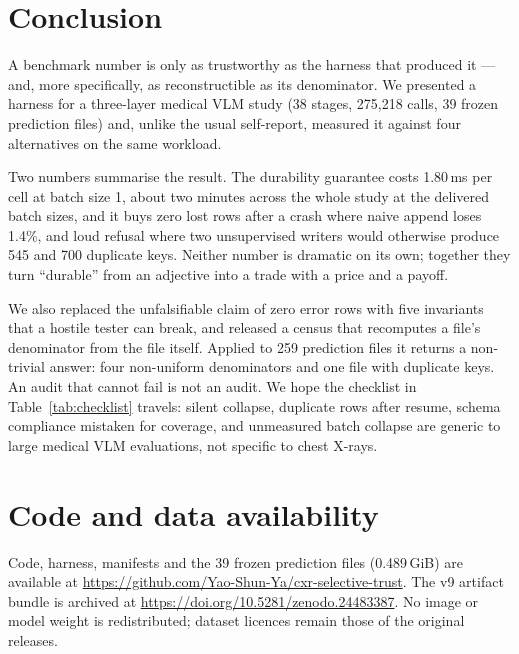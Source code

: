 \section{Conclusion}
\label{sec:conclusion}

A benchmark number is only as trustworthy as the harness that produced it --- and, more specifically, as reconstructible as its denominator. We presented a harness for a three-layer medical VLM study (38 stages, 275,218 calls, 39 frozen prediction files) and, unlike the usual self-report, measured it against four alternatives on the same workload.

Two numbers summarise the result. The durability guarantee costs 1.80\,ms per cell at batch size 1, about two minutes across the whole study at the delivered batch sizes, and it buys zero lost rows after a crash where naive append loses 1.4\%, and loud refusal where two unsupervised writers would otherwise produce 545 and 700 duplicate keys. Neither number is dramatic on its own; together they turn ``durable'' from an adjective into a trade with a price and a payoff.

We also replaced the unfalsifiable claim of zero error rows with five invariants that a hostile tester can break, and released a census that recomputes a file's denominator from the file itself. Applied to 259 prediction files it returns a non-trivial answer: four non-uniform denominators and one file with duplicate keys. An audit that cannot fail is not an audit. We hope the checklist in Table~\ref{tab:checklist} travels: silent collapse, duplicate rows after resume, schema compliance mistaken for coverage, and unmeasured batch collapse are generic to large medical VLM evaluations, not specific to chest X-rays.

\section*{Code and data availability}

Code, harness, manifests and the 39 frozen prediction files (0.489\,GiB) are available at
\url{https://github.com/Yao-Shun-Ya/cxr-selective-trust}. The v9 artifact bundle is
archived at \url{https://doi.org/10.5281/zenodo.24483387}. No image or model weight is
redistributed; dataset licences remain those of the original releases.

